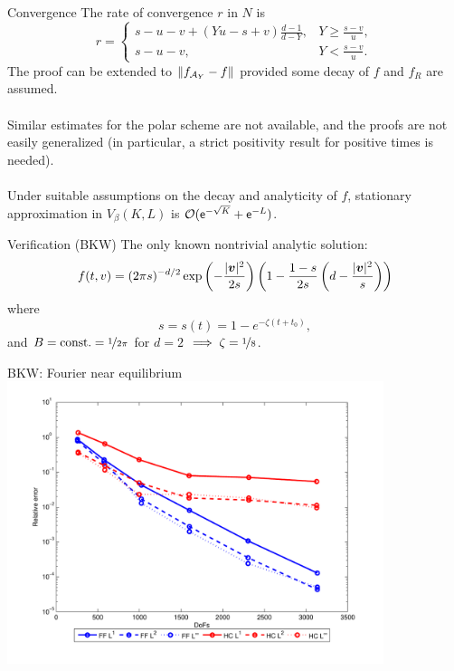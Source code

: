 \documentclass[hyperref={bookmarksopen, colorlinks, linkcolor=blue, urlcolor=green, citecolor=red}, color={usenames,dvipsnames}]{beamer}
\begin{document}
\begin{frame}{Convergence}
The rate of convergence $r$ in $N$ is
\[
    r = \begin{cases}
        s-u-v+(Yu-s+v)\frac{d-1}{d-Y}, & Y \geq \frac{s-v}{u}, \\
        s-u-v, & Y < \frac{s-v}{u}.
    \end{cases}
\]
The proof can be extended to $\|f_{\mathcal{A}_Y}-f\|$ provided some decay of $f$ and $f_R$ are assumed. \\~\\

Similar estimates for the polar scheme are not available, and the proofs are not easily generalized (in
particular, a strict positivity result for positive times is needed). \\~\\

Under suitable assumptions on the decay and analyticity of $f$, stationary approximation in $V_\beta(K,L)$ is
$\mathcal{O}(\mathsf{e}^{-\sqrt{K}} + \mathsf{e}^{-L})$.
\end{frame}

\begin{frame}{Verification (BKW)}
The only known nontrivial analytic solution:
\[
    f(t,v) = (2\pi s)^{-d/2} \exp\left(-\frac{|{\bm v}|^2}{2s}\right)
            \left(1-\frac{1-s}{2s} \left(d-\frac{|{\bm v}|^2}{s}\right)\right)
\]
where 
\[
    s = s(t) = 1 - e^{-\zeta(t+t_0)},
\]
and $B=\text{const.}=\nicefrac{1}{2\pi}$ for $d=2$ $\implies \zeta=\nicefrac{1}{8}$.
\end{frame}

\begin{frame}{BKW: Fourier near equilibrium}
\centering
\includegraphics[width=11cm]{../figs/hcboltz/bkw5-1}
\end{frame}
\end{document}
